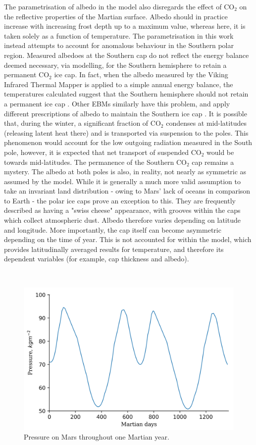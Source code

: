 \documentclass[12pt,onecolumn]{revtex4-2}    %
\begin{document}
The parametrisation of albedo in the model also disregards the effect of $\mathrm{CO_2}$ on the reflective properties of the Martian surface. Albedo should in practice increase with increasing frost depth up to a maximum value, whereas here, it is taken solely as a function of temperature. The parametrisation in this work instead attempts to account for anomalous behaviour in the Southern polar region. Measured albedoes at the Southern cap do not reflect the energy balance deemed necessary, via modelling, for the Southern hemisphere to retain a permanent $\mathrm{CO_2}$ ice cap. In fact, when the albedo measured by the Viking Infrared Thermal Mapper is applied to a simple annual energy balance, the temperatures calculated suggest that the Southern hemisphere should not retain a permanent ice cap \cite{K79}. Other EBMs similarly have this problem, and apply different prescriptions of albedo to maintain the Southern ice cap \cite{FHT98} \cite{JN82}. It is possible that, during the winter, a significant fraction of $\mathrm{CO_2}$ condenses at mid-latitudes (releasing latent heat there) and is transported via suspension to the poles. This phenomenon would account for the low outgoing radiation measured in the South pole, however, it is expected that net transport of suspended $\mathrm{CO_2}$ would be towards mid-latitudes. The permanence of the Southern $\mathrm{CO_2}$ cap remains a mystery. The albedo at both poles is also, in reality, not nearly as symmetric as assumed by the model. While it is generally a much more valid assumption to take an invariant land distribution - owing to Mars' lack of oceans in comparison to Earth - the polar ice caps prove an exception to this. They are frequently described as having a "swiss cheese" appearance, with grooves within the caps which collect atmospheric dust. Albedo therefore varies depending on latitude and longitude. More importantly, the cap itself can become asymmetric depending on the time of year. This is not accounted for within the model, which provides latitudinally averaged results for temperature, and therefore its dependent variables (for example, cap thickness and albedo).

\
\

\begin{figure}[h]
\centering
\includegraphics[width = 14cm]{mars_pressure2.png}
\caption{Pressure on Mars throughout one Martian year.}
\label{fig:test}
\end{figure}
\end{document}
